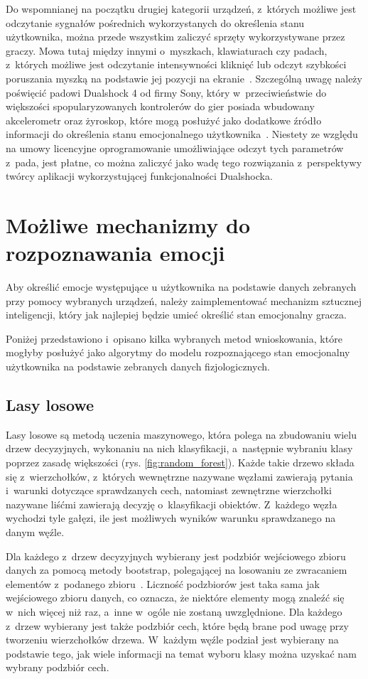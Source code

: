 Do wspomnianej na początku drugiej kategorii urządzeń, z~których możliwe jest odczytanie sygnałów pośrednich wykorzystanych do określenia stanu użytkownika, można przede wszystkim zaliczyć sprzęty wykorzystywane przez graczy. Mowa tutaj między innymi o~myszkach, klawiaturach czy padach, z~których możliwe jest odczytanie intensywności kliknięć lub odczyt szybkości poruszania myszką na podstawie jej pozycji na ekranie~\cite{measuring_emotion_from_gamepad}. Szczególną uwagę należy poświęcić padowi Dualshock 4 od firmy Sony, który w~przeciwieństwie do większości spopularyzowanych kontrolerów do gier posiada wbudowany akcelerometr oraz żyroskop, które mogą posłużyć jako dodatkowe źródło informacji do określenia stanu emocjonalnego użytkownika~\cite{dualshock_specification}. Niestety ze względu na umowy licencyjne oprogramowanie umożliwiające odczyt tych parametrów z~pada, jest płatne, co można zaliczyć jako wadę tego rozwiązania z~perspektywy twórcy aplikacji wykorzystującej funkcjonalności Dualshocka.

\section{Możliwe mechanizmy do rozpoznawania emocji}
Aby określić emocje występujące u użytkownika na podstawie danych zebranych przy pomocy wybranych urządzeń, należy zaimplementować mechanizm sztucznej inteligencji, który jak najlepiej będzie umieć określić stan emocjonalny gracza. 

Poniżej przedstawiono i~opisano kilka wybranych metod wnioskowania, które mogłyby posłużyć jako algorytmy do modelu rozpoznającego stan emocjonalny użytkownika na podstawie zebranych danych fizjologicznych.

\subsection{Lasy losowe}
Lasy losowe są metodą uczenia maszynowego, która polega na zbudowaniu wielu drzew decyzyjnych, wykonaniu na nich klasyfikacji, a~następnie wybraniu klasy poprzez zasadę większości (rys. \ref{fig:random_forest}). Każde takie drzewo składa się z~wierzchołków, z~których wewnętrzne nazywane węzłami zawierają pytania i~warunki dotyczące sprawdzanych cech, natomiast zewnętrzne wierzchołki nazywane liśćmi zawierają decyzję o~klasyfikacji obiektów. Z~każdego węzła wychodzi tyle gałęzi, ile jest możliwych wyników warunku sprawdzanego na danym węźle.

Dla każdego z~drzew decyzyjnych wybierany jest podzbiór wejściowego zbioru danych za pomocą metody bootstrap, polegającej na losowaniu ze zwracaniem elementów z~podanego zbioru~\cite{flach_2012}. Liczność podzbiorów jest taka sama jak wejściowego zbioru danych, co oznacza, że niektóre elementy mogą znaleźć się w~nich więcej niż raz, a~inne w~ogóle nie zostaną uwzględnione. Dla każdego z~drzew wybierany jest także podzbiór cech, które będą brane pod uwagę przy tworzeniu wierzchołków drzewa. W~każdym węźle podział jest wybierany na podstawie tego, jak wiele informacji na temat wyboru klasy można uzyskać nam wybrany podzbiór cech.

